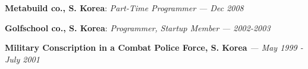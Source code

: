 {\bf Metabuild co., S. Korea}: \emph{Part-Time Programmer}
{\it \footnotesize --- Dec 2008}
\vspace{-0.15in}

{\bf Golfschool co., S. Korea}: \emph{Programmer, Startup Member}
{\it \footnotesize --- 2002-2003}
\vspace{-0.15in}

{\bf Military Conscription in a Combat Police Force, S. Korea}
{\it \footnotesize --- May 1999 - July 2001}

